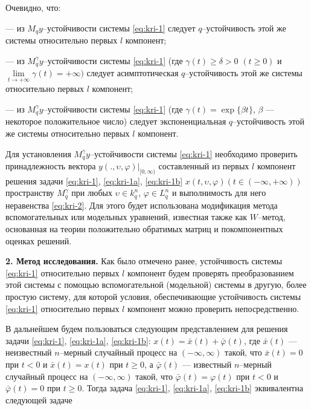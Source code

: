 Очевидно, что:

--- из  $M_qy$--устойчивости системы \eqref{eq:kri-1}
следует $q$--устойчивость этой же системы относительно  первых $l$
компонент;

--- из $M_q^\gamma y$--устойчивости системы \eqref{eq:kri-1}
(где $\gamma (t) \ge \delta > 0$ $(t \ge 0)$ и $\lim \limits _{t
\rightarrow +\infty } \gamma (t) = +\infty )$ следует
асимптотическая $q$--устойчивость этой же системы относительно
первых $l$ компонент;

--- из $M_q^\gamma y$--устойчивости системы \eqref{eq:kri-1}
(где $\gamma (t) = \exp \{\beta t\}$, $\beta$ --- некоторое
положительное число) следует экспоненциальная $q$--устойчивость этой
же системы относительно первых $l$ компонент.


Для установления $M_q^\gamma y$--устойчивости системы \eqref{eq:kri-1} необходимо
проверить принадлежность вектора $y(., \upsilon,\varphi
)|_{[0,\infty)}$ составленный из первых $l$ компонент решения задачи
\eqref{eq:kri-1}, \eqref{eq:kri-1a}, \eqref{eq:kri-1b} $x(t,\upsilon, \varphi)(t \in (-\infty, +\infty))$
пространству $M_q^\gamma$ при любых $\upsilon \in k^n_q$, $\varphi
\in L^n_q$ и выполнимость для него неравенства \eqref{eq:kri-2}. Для этого будет
использована модификация метода вспомогательных  или модельных
уравнений, известная также как $W$--метод, основанная на теории
положительно обратимых матриц и покомпонентных оценках решений.
\smallskip

\textbf {2. Метод исследования.} Как было отмечено ранее,
устойчивость системы \eqref{eq:kri-1} относительно первых $l$ компонент будем
проверять преобразованием этой системы с помощью вспомогательной
(модельной) системы в другую, более простую систему, для которой
условия, обеспечивающие устойчивость системы \eqref{eq:kri-1} относительно первых
$l$ компонент можно проверить непосредственно.

В дальнейшем будем пользоваться следующим представлением для решения
задачи \eqref{eq:kri-1}, \eqref{eq:kri-1a}, \eqref{eq:kri-1b}: $x(t) = \bar x(t) + \bar \varphi (t)$, где
$\bar x(t)$ --- неизвестный $n$--мерный случайный процесс на
$(-\infty, \infty)$ такой, что $\bar x(t) = 0$ при $t < 0$ и $\bar
x(t) = x(t)$ при $t \geq 0$,  а $\bar  \varphi (t)$ --- известный
$n$--мерный случайный процесс на $(-\infty, \infty)$ такой, что
$\bar \varphi(t) = \varphi (t)$ при $t < 0$ и $\bar \varphi(t) = 0$
при $t \geq 0$.  Тогда  задача \eqref{eq:kri-1}, \eqref{eq:kri-1a}, \eqref{eq:kri-1b} эквивалентна
следующей задаче

